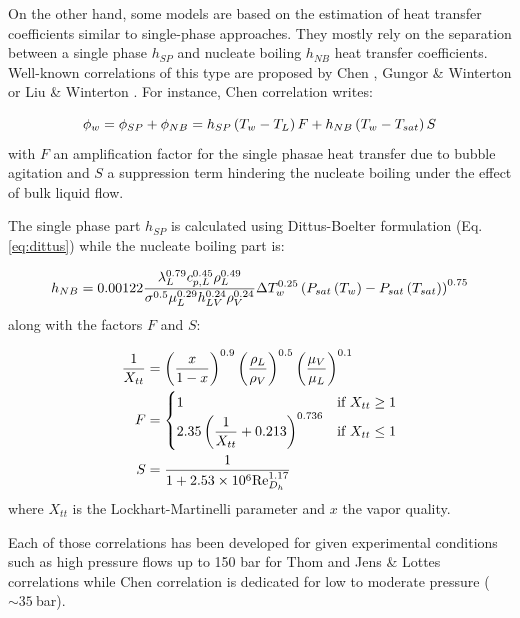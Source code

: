 \npar

On the other hand, some models are based on the estimation of heat transfer coefficients similar to single-phase approaches. They mostly rely on the separation between a single phase $h_{SP}$ and nucleate boiling $h_{NB}$ heat transfer coefficients. Well-known correlations of this type are proposed by Chen \cite{chen_correl}, Gungor \& Winterton \cite{gungor} or Liu \& Winterton \cite{liu_winterton}. For instance, Chen correlation writes:

\begin{equation}
\phi_{w} = \phi_{SP} + \phi_{NB} = h_{SP}\left( T_{w}-T_{L} \right)F + h_{NB}\left( T_{w}-T_{sat} \right)S
\end{equation}
with $F$ an amplification factor for the single phasae heat transfer due to bubble agitation and $S$ a suppression term hindering the nucleate boiling under the effect of bulk liquid flow.

\npar
The single phase part $h_{SP}$ is calculated using Dittus-Boelter \cite{dittus_heat_1985} formulation (Eq. \ref{eq:dittus}) while the nucleate boiling part is:

\begin{equation}
h_{NB} = 0.00122 \frac{\lambda_{L}^{0.79} c_{p,L}^{0.45} \rho_{L}^{0.49}}{\sigma^{0.5} \mu_{L}^{0.29} h_{LV}^{0.24}\rho_{V}^{0.24}} \Delta T_{w}^{0.25} \left( P_{sat}\left( T_{w} \right) - P_{sat}\left( T_{sat} \right) \right)^{0.75}
\end{equation}
along with the factors $F$ and $S$:

\begin{align}
\frac{1}{X_{tt}} & = \parth{\frac{x}{1-x}}^{0.9} \parth{\frac{\rho_{L}}{\rho_{V}}}^{0.5} \parth{\frac{\mu_{V}}{\mu_{L}}}^{0.1} \\
F &= 
\begin{cases}
1\ &\text{if}\ X_{tt}\geq 1\\
2.35 \parth{\dfrac{1}{X_{tt}} + 0.213}^{0.736} &\text{if}\ X_{tt}\leq 1
\end{cases}
\\
%
S &= \dfrac{1}{1+ 2.53\times 10^{6} \Re_{D_{h}}^{1.17}}
\end{align}
where $X_{tt}$ is the Lockhart-Martinelli parameter \cite{lockhart_martinelli} and $x$ the vapor quality.

\npar

Each of those correlations has been developed for given experimental conditions such as high pressure flows up to 150 bar for Thom and Jens \& Lottes correlations while Chen correlation is dedicated for low to moderate pressure ($\sim 35\ $bar).

